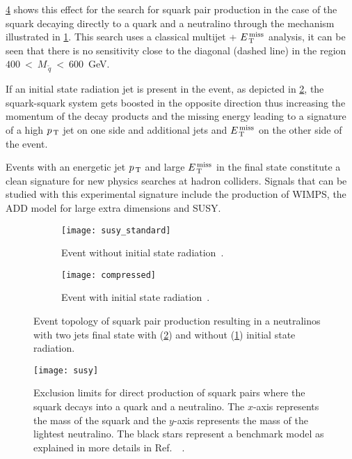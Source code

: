 \cref{fig:susy_exclusion} shows this effect for the search for squark pair
production in the case of the squark decaying directly to a quark and a
neutralino through the mechanism illustrated in \cref{fig:susy_standard}. This
search uses a classical multijet + $E_\mathrm{\, T}^\mathrm{\, miss}$ analysis, it can be seen that there is
no sensitivity close to the diagonal (dashed line) in the region
$400~<~M_{\, \tilde{q}}~<~600$~GeV.

If an initial state radiation jet is present in the event, as depicted in
\cref{fig:susy_compressed}, the squark-squark system gets boosted in the
opposite direction thus increasing the momentum of the decay products and the
missing energy leading to a signature of a high $p_\mathrm{\, T}$ jet on one side and
additional jets and $E_\mathrm{\, T}^\mathrm{\, miss}$ on the other side of the event.

Events with an energetic jet $p_\mathrm{\, T}$ and large $E_\mathrm{\, T}^\mathrm{\, miss}$ in the final state
constitute a clean signature for new physics searches at hadron colliders.
Signals that can be studied with this experimental signature include the
production of WIMPS, the ADD model for large extra dimensions and SUSY\@.
\begin{figure}[!h]
  \centering
  \begin{subfigure}[t]{.48\linewidth}
    \texttt{[image: susy\_standard]}
    \caption{Event without initial state radiation~\cite{SUSYPub}.}
    \label{fig:susy_standard}
  \end{subfigure} \quad
  \begin{subfigure}[t]{.48\linewidth}
    \texttt{[image: compressed]}
    \caption{Event with initial state radiation~\cite{ExotPub}.}
    \label{fig:susy_compressed}
  \end{subfigure}
  \caption{Event topology of squark pair production resulting in a neutralinos
    with two jets final state with (\cref{fig:susy_compressed}) and without
    (\cref{fig:susy_standard}) initial state radiation.}
  \label{fig:motivation}
\end{figure}
\begin{figure}[!htb]
  \centering
  \texttt{[image: susy]}
  \caption{Exclusion limits for direct production of squark
    pairs where the squark decays into a quark and a neutralino. The $x$-axis
    represents the mass of the squark and the $y$-axis represents the mass of
    the lightest neutralino. The black stars represent a benchmark model as
    explained in more details in Ref.~~\cite{SUSYPub}.}
  \label{fig:susy_exclusion}
\end{figure}
